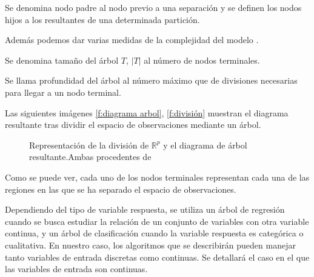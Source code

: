 \begin{defi}
Se denomina nodo padre al nodo previo a una  separación y se definen los nodos hijos a los resultantes de una determinada partición. 
\end{defi}
\noindent Además podemos dar varias medidas de la complejidad del modelo \cite{Hastie 2001}.
\begin{defi}
Se denomina  tamaño del árbol $T$, $|T|$ al número de nodos terminales. 
\end{defi}
\begin{defi}
Se llama profundidad del árbol al número máximo que de divisiones necesarias para llegar a un nodo terminal. 
\end{defi}
\noindent Las  siguientes imágenes \ref{f:diagrama arbol}, \ref{f:división}  muestran el diagrama resultante tras dividir el espacio de observaciones mediante un árbol. 

\begin{figure}[h]
 \centering
 \caption{Representación de la división de $\mathbb{R}^p$ y el diagrama de árbol resultante.Ambas procedentes de \cite{Hastie 2001}}
 \label{f:MARC1}
\end{figure}

\noindent Como se puede ver, cada uno de los nodos terminales representan cada una de las regiones en las que se ha separado el espacio de observaciones. 

\noindent Dependiendo del tipo de variable respuesta, se utiliza un árbol de regresión cuando se busca estudiar la relación de un conjunto de variables con otra variable continua, y un árbol de clasificación cuando la variable respuesta es categórica o cualitativa. En nuestro caso, los algoritmos que se describirán pueden manejar tanto variables de entrada discretas como continuas. Se detallará el caso en el que las variables de entrada son continuas.

